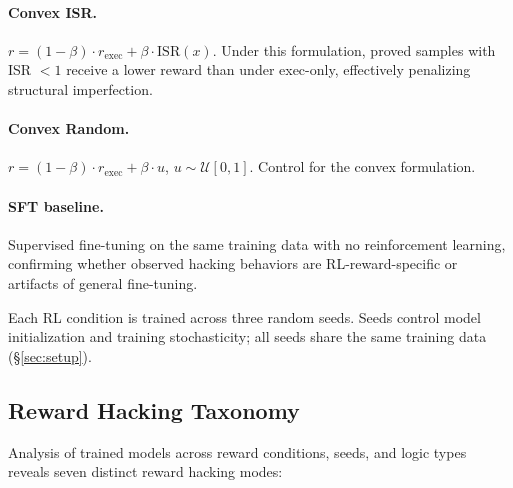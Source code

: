 \paragraph{Convex ISR.}
$r = (1 - \beta) \cdot r_{\text{exec}} + \beta \cdot \text{ISR}(x)$.
Under this formulation, proved samples with ISR $< 1$ receive a lower reward than under exec-only, effectively penalizing structural imperfection.

\paragraph{Convex Random.}
$r = (1 - \beta) \cdot r_{\text{exec}} + \beta \cdot u$, $u \sim \mathcal{U}[0,1]$.
Control for the convex formulation.

\paragraph{SFT baseline.}
Supervised fine-tuning on the same training data with no reinforcement learning, confirming whether observed hacking behaviors are RL-reward-specific or artifacts of general fine-tuning.

Each RL condition is trained across three random seeds.
Seeds control model initialization and training stochasticity; all seeds share the same training data (\S\ref{sec:setup}).

\subsection{Reward Hacking Taxonomy}
\label{sec:taxonomy}

Analysis of trained models across reward conditions, seeds, and logic types reveals seven distinct reward hacking modes:

